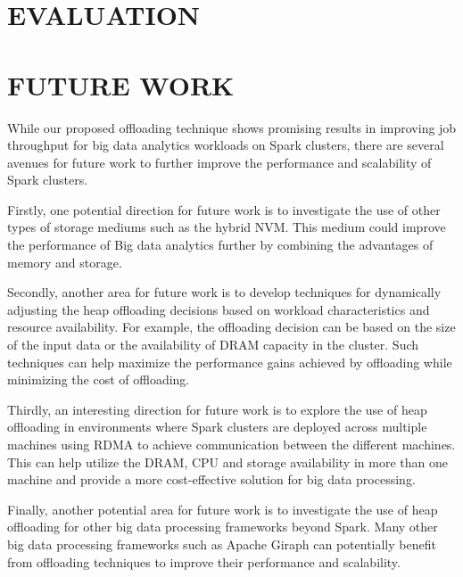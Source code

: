 \documentclass[twocolumn,10pt]{asme2e}
\begin{document}
\subsection*{}

\section*{EVALUATION}

\section*{FUTURE WORK}

While our proposed offloading technique shows promising results in improving job throughput for big data analytics workloads on Spark clusters, there are several avenues for future work to further improve the performance and scalability of Spark clusters. 

Firstly, one potential direction for future work is to investigate the use of other types of storage mediums such as the hybrid NVM. This medium could improve the performance of Big data analytics further by combining the advantages of memory and storage.

Secondly, another area for future work is to develop techniques for dynamically adjusting the heap offloading decisions based on workload characteristics and resource availability. For example, the offloading decision can be based on the size of the input data or the availability of DRAM capacity in the cluster. Such techniques can help maximize the performance gains achieved by offloading while minimizing the cost of offloading.

Thirdly, an interesting direction for future work is to explore the use of heap offloading in environments where Spark clusters are deployed across multiple machines using RDMA to achieve communication between the different machines. This can help utilize the DRAM, CPU and storage availability in more than one machine and provide a more cost-effective solution for big data processing.

Finally, another potential area for future work is to investigate the use of heap offloading for other big data processing frameworks beyond Spark. Many other big data processing frameworks such as Apache Giraph can potentially benefit from offloading techniques to improve their performance and scalability.
\end{document}

